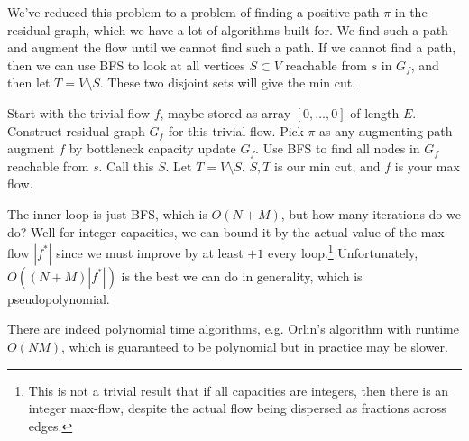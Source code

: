  \begin{algo}
    We've reduced this problem to a problem of finding a positive path $\pi$ in the residual graph, which we have a lot of algorithms built for. We find such a path and augment the flow until we cannot find such a path. If we cannot find a path, then we can use BFS to look at all vertices $S \subset V$ reachable from $s$ in $G_f$, and then let $T = V \setminus S$. These two disjoint sets will give the min cut. 
    
    \begin{algorithm}[H]
      \label{alg:maxflow}
      \begin{algorithmic}
        \State 
        \State Start with the trivial flow $f$, maybe stored as array $[0, \ldots, 0]$ of length $E$. 
          \State Construct residual graph $G_f$ for this trivial flow. 
           
            \State Pick $\pi$ as any augmenting path 
            \State augment $f$ by bottleneck capacity 
            \State update $G_f$. 
          \EndWhile
          \State {}  
          \State Use BFS to find all nodes in $G_f$ reachable from $s$. Call this $S$.  
          \State Let $T = V \setminus S$.  
          \State $S, T$ is our min cut, and $f$ is your max flow. 
        \EndFunction
      \end{algorithmic}
    \end{algorithm}
    The inner loop is just BFS, which is $O(N + M)$, but how many iterations do we do? Well for integer capacities, we can bound it by the actual value of the max flow $|f^\ast|$ since we must improve by at least $+1$ every loop.\footnote{This is not a trivial result that if all capacities are integers, then there is an integer max-flow, despite the actual flow being dispersed as fractions across edges.} Unfortunately, $O((N+M) |f^\ast|)$ is the best we can do in generality, which is pseudopolynomial. 
  \end{algo}

  There are indeed polynomial time algorithms, e.g. Orlin's algorithm with runtime $O(NM)$, which is guaranteed to be polynomial but in practice may be slower. 

